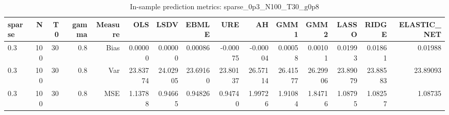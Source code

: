 \begin{table}[!htbp]\centering
\caption{In-sample prediction metrics: sparse_0p3_N100_T30_g0p8}
\label{tab:table2_sparse_0p3_N100_T30_g0p8}
\begin{tabular}{lrrrrrrrrrrrrrr}
\hline
sparse & N & T0 & gamma & Measure & OLS & LSDV & EBMLE & URE & AH & GMM1 & GMM2 & LASSO & RIDGE & ELASTIC_NET \\
\hline
0.3 & 100 & 30 & 0.8 & Bias & 0.00000 & 0.00000 & 0.00086 & -0.00075 & -0.00004 & 0.00058 & 0.00101 & 0.01993 & 0.01861 & 0.01988 \\
0.3 & 100 & 30 & 0.8 & Var & 23.83774 & 24.02905 & 23.69160 & 23.80137 & 26.57114 & 26.41577 & 26.29906 & 23.89079 & 23.88583 & 23.89093 \\
0.3 & 100 & 30 & 0.8 & MSE & 1.13788 & 0.94665 & 0.94826 & 0.94740 & 1.99726 & 1.91084 & 1.84716 & 1.08795 & 1.08257 & 1.08735 \\
\hline
\end{tabular}
\end{table}

